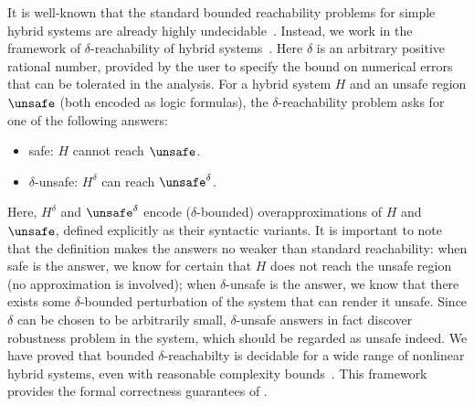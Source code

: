 It is well-known that the standard bounded reachability problems for
simple hybrid systems are already highly
undecidable~\cite{DBLP:conf/hybrid/AlurCHH92}.
Instead, we work in the framework of $\delta$-reachability of hybrid systems~\cite{DBLP:journals/corr/GaoKCC14}.
Here $\delta$ is an arbitrary positive rational number, provided by the user to
specify the bound on numerical errors that can be tolerated in the analysis.
For a hybrid system $H$ and an unsafe region $\unsafe$ (both encoded as logic formulas),
the $\delta$-reachability problem asks for one of the following answers:
\begin{itemize}
        \item {\sf safe}: $H$ cannot reach $\unsafe$.
        \item {\sf $\delta$-unsafe}: $H^{\delta}$ can reach $\unsafe^{\delta}$.
\end{itemize}
Here, $H^{\delta}$ and $\unsafe^{\delta}$ encode ($\delta$-bounded)
overapproximations of $H$ and $\unsafe$, defined explicitly as their
syntactic
variants. %
It is important to note that the definition makes the answers no
weaker than standard reachability: when {\sf safe} is the answer, we
know for certain that $H$ does not reach the unsafe region (no
approximation is involved); when {\sf $\delta$-unsafe} is the answer,
we know that there exists some $\delta$-bounded perturbation of the
system that can render it unsafe.  Since $\delta$ can be chosen to be
arbitrarily small, {\sf$\delta$-unsafe} answers in fact discover
robustness problem in the system, which should be regarded as unsafe
indeed. We have proved that bounded $\delta$-reachabilty is decidable
for a wide range of nonlinear hybrid systems, even with reasonable
complexity bounds~\cite{DBLP:journals/corr/GaoKCC14}. This framework
provides the formal correctness guarantees of \dReach{}.

